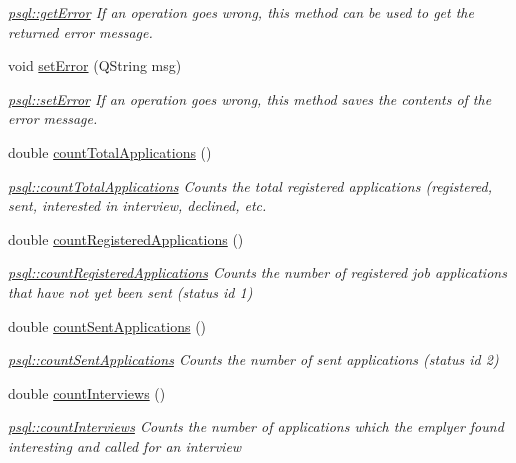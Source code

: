 \begin{DoxyCompactItemize}
\begin{DoxyCompactList}\small\item\em \mbox{\hyperlink{classpsql_a5f51e254b67ff932f287df2184ccc043}{psql\+::get\+Error}} If an operation goes wrong, this method can be used to get the returned error message. \end{DoxyCompactList}\item 
void \mbox{\hyperlink{classpsql_a9a0d5ba32aabe6018a36fb0bc185445b}{set\+Error}} (Q\+String msg)
\begin{DoxyCompactList}\small\item\em \mbox{\hyperlink{classpsql_a9a0d5ba32aabe6018a36fb0bc185445b}{psql\+::set\+Error}} If an operation goes wrong, this method saves the contents of the error message. \end{DoxyCompactList}\item 
double \mbox{\hyperlink{classpsql_a496d0a426a1539bf9babd1dd4e9fcd96}{count\+Total\+Applications}} ()
\begin{DoxyCompactList}\small\item\em \mbox{\hyperlink{classpsql_a496d0a426a1539bf9babd1dd4e9fcd96}{psql\+::count\+Total\+Applications}} Counts the total registered applications (registered, sent, interested in interview, declined, etc. \end{DoxyCompactList}\item 
double \mbox{\hyperlink{classpsql_a8673a80968d293cd3ead6e6e9da8dd8a}{count\+Registered\+Applications}} ()
\begin{DoxyCompactList}\small\item\em \mbox{\hyperlink{classpsql_a8673a80968d293cd3ead6e6e9da8dd8a}{psql\+::count\+Registered\+Applications}} Counts the number of registered job applications that have not yet been sent (status id 1) \end{DoxyCompactList}\item 
double \mbox{\hyperlink{classpsql_af5e6768f6c51ac7b94571505f7a628e4}{count\+Sent\+Applications}} ()
\begin{DoxyCompactList}\small\item\em \mbox{\hyperlink{classpsql_af5e6768f6c51ac7b94571505f7a628e4}{psql\+::count\+Sent\+Applications}} Counts the number of sent applications (status id 2) \end{DoxyCompactList}\item 
double \mbox{\hyperlink{classpsql_a84c1fdea2d09783a39677c4f79d924fc}{count\+Interviews}} ()
\begin{DoxyCompactList}\small\item\em \mbox{\hyperlink{classpsql_a84c1fdea2d09783a39677c4f79d924fc}{psql\+::count\+Interviews}} Counts the number of applications which the emplyer found interesting and called for an interview \end{DoxyCompactList}\item 

\end{DoxyCompactItemize}
